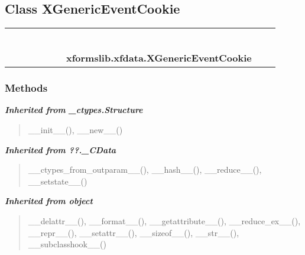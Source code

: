 \subsection{Class XGenericEventCookie}

    \label{xformslib:xfdata:XGenericEventCookie}
\begin{tabular}{cccccccccc}
\multicolumn{2}{r}{\settowidth{\BCL}{object}\multirow{2}{\BCL}{object}}
&&
&&
&&
  \\\cline{3-3}
  &&\multicolumn{1}{c|}{}
&&
&&
&&
  \\
\multicolumn{4}{r}{\settowidth{\BCL}{??.\_CData}\multirow{2}{\BCL}{??.\_CData}}
&&
&&
  \\\cline{5-5}
  &&&&\multicolumn{1}{c|}{}
&&
&&
  \\
\multicolumn{6}{r}{\settowidth{\BCL}{\_ctypes.Structure}\multirow{2}{\BCL}{\_ctypes.Structure}}
&&
  \\\cline{7-7}
  &&&&&&\multicolumn{1}{c|}{}
&&
  \\
&&&&&&\multicolumn{2}{l}{\textbf{xformslib.xfdata.XGenericEventCookie}}
\end{tabular}



  \subsubsection{Methods}


\large{\textbf{\textit{Inherited from \_ctypes.Structure}}}

\begin{quote}
\_\_init\_\_(), \_\_new\_\_()
\end{quote}

\large{\textbf{\textit{Inherited from ??.\_CData}}}

\begin{quote}
\_\_ctypes\_from\_outparam\_\_(), \_\_hash\_\_(), \_\_reduce\_\_(), \_\_setstate\_\_()
\end{quote}

\large{\textbf{\textit{Inherited from object}}}

\begin{quote}
\_\_delattr\_\_(), \_\_format\_\_(), \_\_getattribute\_\_(), \_\_reduce\_ex\_\_(), \_\_repr\_\_(), \_\_setattr\_\_(), \_\_sizeof\_\_(), \_\_str\_\_(), \_\_subclasshook\_\_()
\end{quote}

